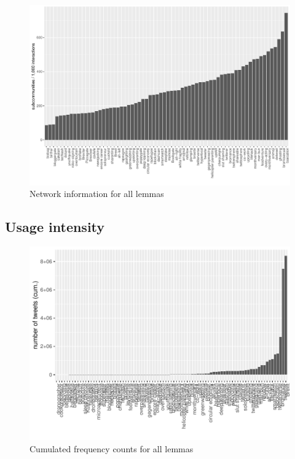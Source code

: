 \documentclass[
  a4paper,
  ]{scrartcl}
\begin{document}
    \begin{figure}[H]
      \centering
      \includegraphics[width=\linewidth, height=.8\textheight, keepaspectratio]{images/communities_last_all.pdf}
      \caption{Network information for all lemmas}
    \end{figure}

  \subsection{Usage intensity}

    \begin{figure}[H]
      \centering
      \includegraphics[width=\linewidth, height=.8\textheight, keepaspectratio]{images/comp_ui_all_cum.pdf}
      \caption{Cumulated frequency counts for all lemmas}
    \end{figure}
\end{document}
